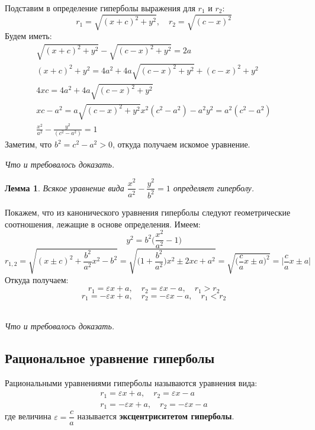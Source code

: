 \documentclass[a4paper,12pt,oneside]{extbook}
\newcommand{\newpar}{$ $\par\nobreak\ignorespaces}
\theoremstyle{numbered}
\theoremstyle{unnumbered}
\theoremstyle{named}
\theoremstyle{unnumbered}
\theoremstyle{named}
\newtheorem{lemma}{Лемма}[section]
\theoremstyle{named}
\theoremstyle{named}
\renewenvironment{proof}[1][]{\breakenv[Доказательство]{\if\relax\detokenize{#1}\relax\else\;\fi}{\textbf{#1}}}{\smallskip\newpar \hfill\textit{Что и требовалось доказать.}}
\begin{document}
\begin{proof}
    Подставим в определение гиперболы выражения для \(r_1\) и \(r_2\):
    \[
        r_1 = \sqrt{{(x + c)}^2 + y^2}, \quad r_2 = \sqrt{{(c - x)}^2}
    \]
    Будем иметь:
    \begin{gather*}
        \sqrt{{(x + c)}^2 + y^2} - \sqrt{{(c - x)}^2 + y^2} = 2a \\
        {(x + c)}^2 + y^2 = 4a^2 + 4a \sqrt{{(c - x)}^2 + y^2} + {(c - x)}^2 + y^2 \\
        4xc = 4a^2 + 4a \sqrt{{(c - x)}^2 + y^2} \\
        xc - a^2 = a \sqrt{{(c - x)}^2 + y^2}
        x^2 (c^2 - a^2) - a^2 y^2 = a^2 (c^2 - a^2) \\
        \frac{x^2}{a^2} - \frac{y^2}{(c^2 - a^2)} = 1
    \end{gather*}
    Заметим, что \(b^2 = c^2 - a^2 > 0\), откуда получаем искомое уравнение.
\end{proof}

\begin{lemma}
    Всякое уравнение вида \(\dfrac{x^2}{a^2} - \dfrac{y^2}{b^2} = 1\) определяет гиперболу.
\end{lemma}

\begin{proof}
    Покажем, что из канонического уравнения гиперболы следуют геометрические соотношения, лежащие в основе определения. Имеем:
    \[
        y^2 = b^2 \Big(\frac{x^2}{a^2} - 1\Big)
    \]
    \[
        r_{1, 2} = \sqrt{{(x \pm c)}^2 + \frac{b^2}{a^2} x^2 - b^2} = \sqrt{\Big(1 + \frac{b^2}{a^2}\Big) x^2 \pm 2xc + a^2} = \sqrt{\Big(\frac{c}{a}x \pm a\Big)^2} = \Big| \frac{c}{a}x \pm a \Big|
    \]
    Откуда получаем:
    \[
        r_1 = \varepsilon x + a, \quad r_2 = \varepsilon x - a, \quad r_1 > r_2
    \]
    \[
        r_1 = -\varepsilon x + a, \quad r_2 = -\varepsilon x - a, \quad r_1 < r_2
    \]
\end{proof}

\subsection{Рациональное уравнение гиперболы}%
\label{sub:Рациональное уравнение гиперболы}

\begin{siderules}
    Рациональными уравнениями гиперболы называются уравнения вида:
    \begin{gather*}
        r_1 = \varepsilon x + a, \quad r_2 = \varepsilon x - a \\
        r_1 = -\varepsilon x + a, \quad r_2 = -\varepsilon x - a
    \end{gather*}
    где величина \(\varepsilon = \dfrac{c}{a}\) называется \textbf{эксцентриситетом гиперболы}.
\end{siderules}
\end{document}
